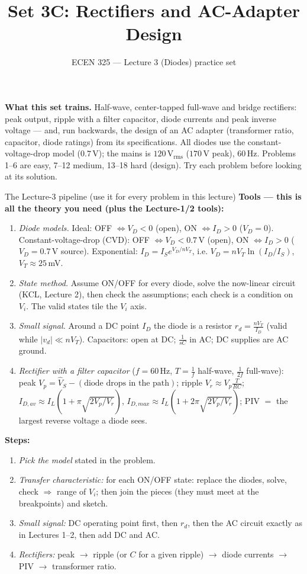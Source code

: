 \documentclass[11pt]{article}
\title{Set 3C: Rectifiers and AC-Adapter Design}
\author{ECEN 325 --- Lecture 3 (Diodes) practice set}
\date{}
\begin{document}
\maketitle

\textbf{What this set trains.} Half-wave, center-tapped full-wave and bridge rectifiers: peak output, ripple with a
filter capacitor, diode currents and peak inverse voltage --- and, run backwards, the design of an AC adapter
(transformer ratio, capacitor, diode ratings) from its specifications. All diodes use the constant-voltage-drop
model ($0.7$\,V); the mains is $120\,\mathrm{V_{rms}}$ ($170$\,V peak), $60$\,Hz. Problems 1--6 are easy, 7--12
medium, 13--18 hard (design). Try each problem before looking at its solution.


\begin{cardbox}{The Lecture-3 pipeline (use it for every problem in this lecture)}
\textbf{Tools --- this is all the theory you need (plus the Lecture-1/2 tools):}
\begin{enumerate}[label=\textbf{T\arabic*},leftmargin=2.2em,itemsep=1pt]
\item \emph{Diode models.} Ideal: OFF $\Leftrightarrow V_D<0$ (open), ON $\Leftrightarrow I_D>0$ ($V_D=0$).
      Constant-voltage-drop (CVD): OFF $\Leftrightarrow V_D<0.7$\,V (open), ON $\Leftrightarrow I_D>0$ ($V_D=0.7$\,V source).
      Exponential: $I_D = I_S e^{V_D/nV_T}$, i.e. $V_D = nV_T\ln(I_D/I_S)$, $V_T\approx 25$\,mV.
\item \emph{State method.} Assume ON/OFF for every diode, solve the now-linear circuit (KCL, Lecture 2), then check
      the assumptions; each check is a condition on $V_i$. The valid states tile the $V_i$ axis.
\item \emph{Small signal.} Around a DC point $I_D$ the diode is a resistor $r_d = \frac{nV_T}{I_D}$
      (valid while $|v_d|\ll nV_T$). Capacitors: open at DC; $\frac{1}{sC}$ in AC; DC supplies are AC ground.
\item \emph{Rectifier with a filter capacitor} ($f=60$\,Hz, $T = \frac{1}{f}$ half-wave, $\frac{1}{2f}$ full-wave):
      peak $V_p=\hat V_S - (\text{diode drops in the path})$; ripple $V_r \approx V_p\frac{T}{RC}$;
      $I_{D,av} \approx I_L\left(1+\pi\sqrt{2V_p/V_r}\right)$, $I_{D,max}\approx I_L\left(1+2\pi\sqrt{2V_p/V_r}\right)$;
      PIV $=$ the largest reverse voltage a diode sees.
\end{enumerate}
\textbf{Steps:}
\begin{enumerate}[leftmargin=2.2em,itemsep=1pt]
\item \emph{Pick the model} stated in the problem.
\item \emph{Transfer characteristic:} for each ON/OFF state: replace the diodes, solve, check $\Rightarrow$ range of $V_i$;
      then join the pieces (they must meet at the breakpoints) and sketch.
\item \emph{Small signal:} DC operating point first, then $r_d$, then the AC circuit exactly as in Lectures 1--2,
      then add DC and AC.
\item \emph{Rectifiers:} peak $\to$ ripple (or $C$ for a given ripple) $\to$ diode currents $\to$ PIV $\to$ transformer ratio.
\end{enumerate}
\end{cardbox}
\end{document}
